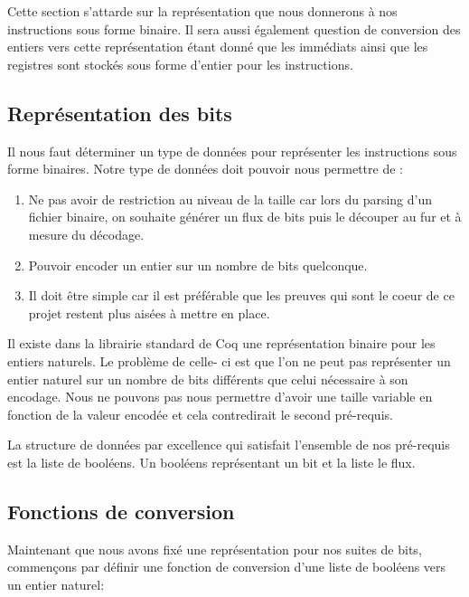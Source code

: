 \documentclass {article}
\newcommand{\codefrom}[3]
           {}
\theoremstyle{definition}
\theoremstyle{remark}
\begin{document}
Cette section s'attarde sur la représentation que nous donnerons à nos instructions
sous forme binaire. Il sera aussi également question de conversion des entiers vers cette
représentation étant donné que les immédiats ainsi que les registres sont stockés sous forme d'entier
pour les instructions.



\subsection{Représentation des bits}


Il nous faut déterminer un type de données pour représenter
les instructions sous forme binaires.
Notre type de données doit pouvoir nous permettre de :
\begin{enumerate}
\item Ne pas avoir de restriction au niveau de la taille car lors du parsing d'un fichier binaire,
  on souhaite générer un flux de bits puis le découper au fur et à mesure du décodage.
\item Pouvoir encoder un entier sur un nombre de bits quelconque.
\item Il doit être simple car il est préférable que les preuves qui sont le coeur de ce projet restent
  plus aisées à mettre en place.
\end{enumerate}

Il existe dans la librairie standard de Coq une représentation binaire pour les entiers naturels.
Le problème de celle- ci est que l'on ne peut pas représenter un entier naturel sur un nombre de bits différents
que celui nécessaire à son encodage. Nous ne pouvons pas nous permettre d'avoir une taille variable en
fonction de la valeur encodée et cela contredirait le second pré-requis.

La structure de données par excellence qui satisfait l'ensemble de nos pré-requis est la liste de booléens.
Un booléens représentant un bit et la liste le flux.

\codefrom{src}{ast_instructions}{binary_instruction}




\subsection{Fonctions de conversion}
\label{Fonctions de conversion}
Maintenant que nous avons fixé une représentation pour nos suites de bits, commençons par définir
une fonction de conversion d'une liste de booléens vers un entier naturel:
\end{document}
